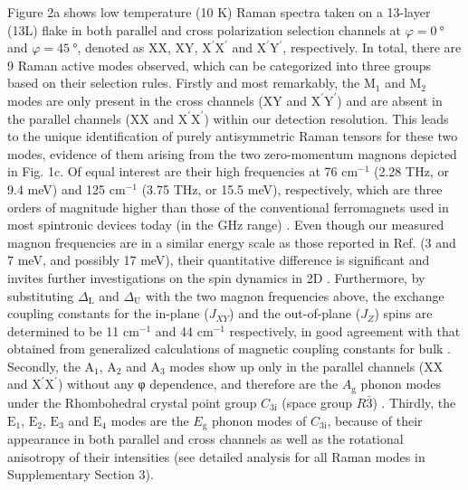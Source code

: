 \documentclass[prl, preprint, superscriptaddress]{revtex4-1}
\begin{document}
Figure 2a shows low temperature (10 K) Raman spectra taken on a 13-layer (13L)  flake in both parallel and cross polarization selection channels at $\varphi=\SI{0}{\degree}$ and $\varphi=\SI{45}{\degree}$, denoted as XX, XY, $\mathrm{X^{\prime}X^{\prime}}$ and $\mathrm{X^{\prime}Y^{\prime}}$, respectively. In total, there are 9 Raman active modes observed, which can be categorized into three groups based on their selection rules. Firstly and most remarkably, the $\mathrm{M_1}$ and $\mathrm{M_2}$ modes are only present in the cross channels (XY and $\mathrm{X^{\prime}Y^{\prime}}$) and are absent in the parallel channels (XX and $\mathrm{X^{\prime}X^{\prime}}$) within our detection resolution. This leads to the unique identification of purely antisymmetric Raman tensors for these two modes, evidence of them arising from the two zero-momentum magnons depicted in Fig. 1c. Of equal interest are their high frequencies at 76 $\mathrm{cm}^{-1}$ (2.28 THz, or 9.4 meV) and 125 $\mathrm{cm}^{-1}$ (3.75 THz, or 15.5 meV), respectively, which are three orders of magnitude higher than those of the conventional ferromagnets used in most spintronic devices today (in the GHz range) \cite{Koopmans2005, Kirilyuk2010}. Even though our measured magnon frequencies are in a similar energy scale as those reported in Ref. \cite{Klein2018} (3 and 7 meV, and possibly 17 meV), their quantitative difference is significant and invites further investigations on the spin dynamics in 2D . Furthermore, by substituting $\Delta_\mathrm{L}$ and $\Delta_\mathrm{U}$ with the two magnon frequencies above, the exchange coupling constants for the in-plane ($J_{XY}$) and the out-of-plane ($J_Z$) spins are determined to be 11 $\mathrm{cm}^{-1}$ and 44 $\mathrm{cm}^{-1}$ respectively, in good agreement with that obtained from generalized calculations of magnetic coupling constants for bulk  \cite{Feldkemper1998}. Secondly, the $\mathrm{A_1}$, $\mathrm{A_2}$ and $\mathrm{A_3}$ modes show up only in the parallel channels (XX and $\mathrm{X^{\prime}X^{\prime}}$) without any φ dependence, and therefore are the $A_\mathrm{g}$ phonon modes under the Rhombohedral crystal point group $C_\mathrm{3i}$ (space group $R\bar3$) \cite{Larson2018}. Thirdly, the $\mathrm{E_1}$, $\mathrm{E_2}$, $\mathrm{E_3}$ and $\mathrm{E_4}$ modes are the $E_\mathrm{g}$ phonon modes of $C_\mathrm{3i}$, because of their appearance in both parallel and cross channels as well as the rotational anisotropy of their intensities (see detailed analysis for all Raman modes in Supplementary Section 3). 
\end{document}
